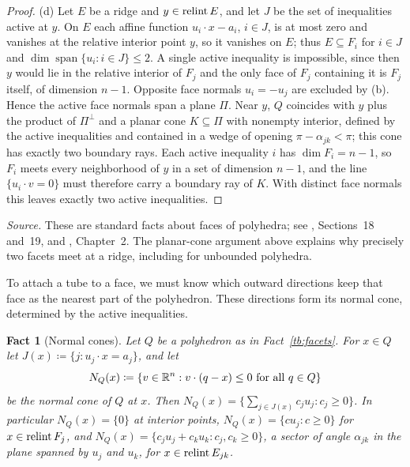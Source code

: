 \documentclass[11pt,letterpaper]{article}
\theoremstyle{plain}
\newtheorem{fact}{Fact}[section]
\begin{document}
\begin{proof}
(d) Let \(E\) be a ridge and \(y\in\operatorname{relint} E\), and let \(J\) be the set of
inequalities active at \(y\). On \(E\) each affine function
\(u_i\cdot x-a_i\), \(i\in J\), is at most zero and vanishes at the relative
interior point \(y\), so it vanishes on \(E\); thus \(E\subseteq F_i\) for
\(i\in J\) and \(\dim\operatorname{span}\{u_i:i\in J\}\le2\). A single active
inequality is impossible, since then \(y\) would lie in the relative interior
of \(F_j\) and the only face of \(F_j\) containing it is \(F_j\) itself, of
dimension \(n-1\). Opposite face normals \(u_i=-u_j\) are excluded by (b). Hence
the active face normals span a plane \(\Pi\). Near \(y\), \(Q\) coincides with
\(y\) plus the product of \(\Pi^\perp\) and a planar cone \(K\subseteq\Pi\)
with nonempty interior, defined by the active inequalities and contained in
a wedge of opening \(\pi-\alpha_{jk}<\pi\); this cone has exactly two
boundary rays. Each active inequality \(i\) has \(\dim F_i=n-1\), so
\(F_i\) meets every neighborhood of \(y\) in a set of dimension \(n-1\), and
the line \(\{u_i\cdot v=0\}\) must therefore carry a boundary ray of \(K\).
With distinct face normals this leaves exactly two active inequalities.
\end{proof}

\emph{Source.} These are standard facts about faces of polyhedra; see
, Sections~18 and~19, and , Chapter~2.
The planar-cone argument above explains why precisely two facets
meet at a ridge, including for unbounded polyhedra.

To attach a tube to a face, we must know which outward directions
keep that face as the nearest part of the polyhedron. These directions
form its normal cone, determined by the active inequalities.

\begin{fact}[Normal cones]\label{tb:normalcone}
Let \(Q\) be a polyhedron as in Fact~\ref{tb:facets}. For \(x\in Q\) let
\(J(x)\coloneqq \{j:u_j\cdot x=a_j\}\), and let
\[
 N_Q(x)\coloneqq \{v\in\mathbb R^n:v\cdot(q-x)\le0\text{ for all }q\in Q\}
\]
be the \emph{normal cone} of \(Q\) at \(x\). Then
\(N_Q(x)=\{\sum_{j\in J(x)}c_ju_j:c_j\ge0\}\). In particular
\(N_Q(x)=\{0\}\) at interior points, \(N_Q(x)=\{cu_j:c\ge0\}\) for
\(x\in\operatorname{relint} F_j\), and \(N_Q(x)=\{c_ju_j+c_ku_k:c_j,c_k\ge0\}\), a sector of
angle \(\alpha_{jk}\) in the plane spanned by \(u_j\) and \(u_k\), for
\(x\in\operatorname{relint} E_{jk}\).
\end{fact}
\end{document}
